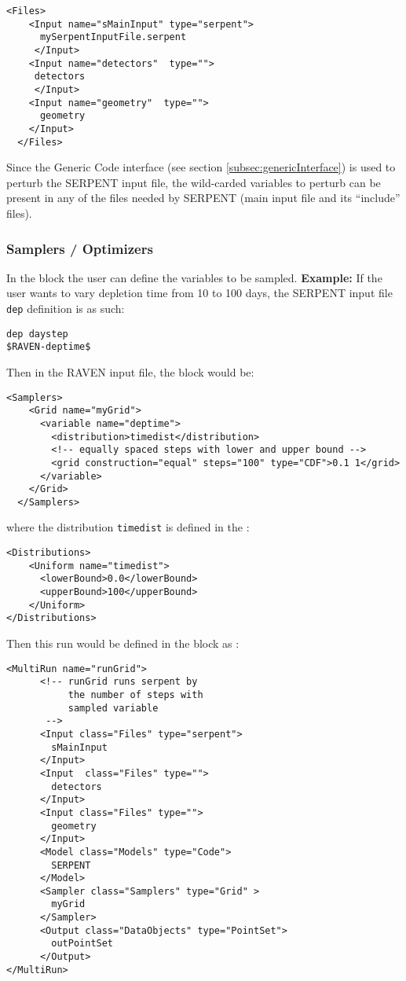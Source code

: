 \begin{lstlisting}[style=XML]
  <Files>
    <Input name="sMainInput" type="serpent">
      mySerpentInputFile.serpent
     </Input>
    <Input name="detectors"  type="">
     detectors
     </Input>
    <Input name="geometry"  type="">
      geometry
    </Input>
  </Files>
\end{lstlisting}

\nb Since the Generic Code interface (see section  \ref{subsec:genericInterface})
      is used to perturb the SERPENT input file, the wild-carded variables to perturb
      can be present in any of the files needed by SERPENT (main input file and its ``include'' files).

\subsubsection{Samplers / Optimizers}
In the  block the user can define the variables
to be sampled.
\textbf{Example:} If the user wants to vary depletion time from
10 to 100 days, the SERPENT input file \texttt{dep} definition is as such:
\begin{lstlisting}
dep daystep 
$RAVEN-deptime$ 
\end{lstlisting}

Then in the RAVEN input file, the  block would be:
\begin{lstlisting}[style=XML]
  <Samplers>
    <Grid name="myGrid">
      <variable name="deptime">
        <distribution>timedist</distribution>
        <!-- equally spaced steps with lower and upper bound -->
        <grid construction="equal" steps="100" type="CDF">0.1 1</grid>
      </variable>
    </Grid>
  </Samplers>
\end{lstlisting}
where the distribution \texttt{timedist} is defined in the :
\begin{lstlisting}[style=XML]
  <Distributions>
    <Uniform name="timedist">
      <lowerBound>0.0</lowerBound>
      <upperBound>100</upperBound>
    </Uniform>
</Distributions>
\end{lstlisting}

Then this run would be defined in the  block as :
\begin{lstlisting}[style=XML]
<MultiRun name="runGrid">
      <!-- runGrid runs serpent by 
           the number of steps with
           sampled variable 
       -->
      <Input class="Files" type="serpent">
        sMainInput
      </Input>
      <Input  class="Files" type="">
        detectors
      </Input>
      <Input class="Files" type="">
        geometry
      </Input>
      <Model class="Models" type="Code">
        SERPENT
      </Model>
      <Sampler class="Samplers" type="Grid" >
        myGrid
      </Sampler>
      <Output class="DataObjects" type="PointSet">
        outPointSet
      </Output>
</MultiRun>
\end{lstlisting}

